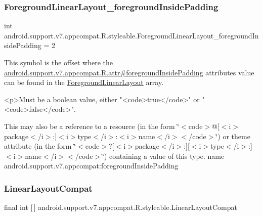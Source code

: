 \subsubsection{\texorpdfstring{Foreground\+Linear\+Layout\+\_\+foreground\+Inside\+Padding}{ForegroundLinearLayout\_foregroundInsidePadding}}
{\footnotesize\ttfamily int android.\+support.\+v7.\+appcompat.\+R.\+styleable.\+Foreground\+Linear\+Layout\+\_\+foreground\+Inside\+Padding = 2\hspace{0.3cm}{\ttfamily [static]}}

This symbol is the offset where the \hyperlink{classandroid_1_1support_1_1v7_1_1appcompat_1_1R_1_1attr_ad76026ff556be723d0d119ea4fae113b}{android.\+support.\+v7.\+appcompat.\+R.\+attr\#foreground\+Inside\+Padding} attribute\textquotesingle{}s value can be found in the \hyperlink{classandroid_1_1support_1_1v7_1_1appcompat_1_1R_1_1styleable_ad3fca4982ac43d82ecd05796cc15eef9}{Foreground\+Linear\+Layout} array.

\begin{DoxyVerb}      <p>Must be a boolean value, either "<code>true</code>" or "<code>false</code>".
\end{DoxyVerb}
 

This may also be a reference to a resource (in the form \char`\"{}$<$code$>$@\mbox{[}$<$i$>$package$<$/i$>$\+:\mbox{]}$<$i$>$type$<$/i$>$\+:$<$i$>$name$<$/i$>$$<$/code$>$\char`\"{}) or theme attribute (in the form \char`\"{}$<$code$>$?\mbox{[}$<$i$>$package$<$/i$>$\+:\mbox{]}\mbox{[}$<$i$>$type$<$/i$>$\+:\mbox{]}$<$i$>$name$<$/i$>$$<$/code$>$\char`\"{}) containing a value of this type.  name android.\+support.\+v7.\+appcompat\+:foreground\+Inside\+Padding \mbox{\label{classandroid_1_1support_1_1v7_1_1appcompat_1_1R_1_1styleable_a765d32873526b8c36de14b184094582d}} 
\subsubsection{\texorpdfstring{Linear\+Layout\+Compat}{LinearLayoutCompat}}
{\footnotesize\ttfamily final int \mbox{[}$\,$\mbox{]} android.\+support.\+v7.\+appcompat.\+R.\+styleable.\+Linear\+Layout\+Compat\hspace{0.3cm}{\ttfamily [static]}}

